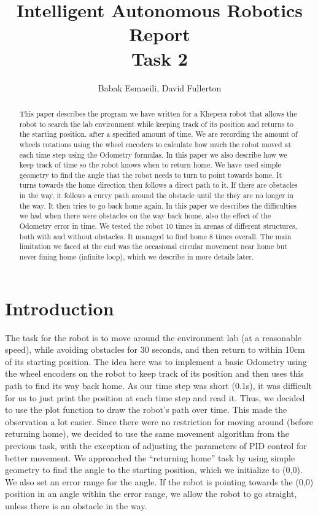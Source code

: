 \documentclass[]{article}
\begin{document}
\title{Intelligent Autonomous Robotics Report\\ Task 2}
\author{Babak Esmaeili, David Fullerton}
\maketitle

\begin{abstract}
This paper describes the program we have written for a Khepera robot that allows the robot to search the lab environment while keeping track of its position and returns to the starting position. after a specified amount of time. We are recording the amount of wheels rotations using the wheel encoders to calculate how much the robot moved at each time step using the Odometry formulas. In this paper we also describe how we keep track of time so the robot knows when to return home. We have used simple geometry to find the angle that the robot needs to turn to point towards home. It turns towards the home direction then follows a direct path to it. If there are obstacles in the way, it follows a curvy path around the obstacle until the they are no longer in the way. It then tries to go back home again. In this paper we describes the difficulties we had when there were obstacles on the way back home, also the effect of the Odometry error in time.  We tested the robot 10 times in arenas of different structures, both with and without obstacles. It managed to find home 8 times overall. The main limitation we faced at the end was the occasional circular movement near home but never fining home (infinite loop), which we describe in more details later. 
\end{abstract}


\section{Introduction}
The task for the robot is to move around the environment lab (at a reasonable speed), while avoiding obstacles  for 30 seconds, and then return to within 10cm of its starting position. The idea here was to implement a basic Odometry using the wheel encoders on the robot to keep track of its position and then uses this path to find its way back home. As our time step was short (0.1s), it was difficult for us to just print the position at each time step and read it. Thus, we decided to use the plot function to draw the robot's path over time. This made the observation a lot easier. Since there were no restriction for moving around (before returning home), we decided to use the same movement algorithm from the previous task, with the exception of adjusting the parameters of PID control for better movement. We approached the “returning home” task by using simple geometry to find the angle to the starting position, which we initialize to (0,0). We also set an error range for the angle. If the robot is pointing towards the (0,0) position in an angle within the error range, we allow the robot to go straight, unless there is an obstacle in the way.  
\end{document}
